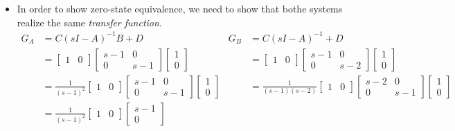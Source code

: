 \documentclass[10pt]{article}
\begin{document}
\begin{itemize}
\item[]
In order to show zero-state equivalence, we need to show that bothe
systems realize the same \emph{transfer function}.
\begin{align*}
  G_A &=C(sI-A)^{-1}B + D & G_B &= C(sI - A)^{-1} + D\\
  &=
  \begin{bmatrix}
    1 &0 
  \end{bmatrix}
  \begin{bmatrix}
    s-1 & 0 \\ 0 & s-1
  \end{bmatrix}
  \begin{bmatrix}
    1\\0
  \end{bmatrix}
  &&=
  \begin{bmatrix}
    1 &0 
  \end{bmatrix}
  \begin{bmatrix}
    s-1 & 0 \\ 0 & s-2
  \end{bmatrix}
  \begin{bmatrix}
    1\\0
  \end{bmatrix}\\
  &= \frac{1}{(s-1)^2}
  \begin{bmatrix}
    1 &0 
  \end{bmatrix}
  \begin{bmatrix}
    s-1 & 0 \\ 0 & s-1
  \end{bmatrix}
  \begin{bmatrix}
    1\\0
  \end{bmatrix}
  &&=\frac{1}{(s-1)(s-2)}
  \begin{bmatrix}
    1 &0 
  \end{bmatrix}
  \begin{bmatrix}
    s-2 & 0 \\ 0 & s-1
  \end{bmatrix}
  \begin{bmatrix}
    1\\0
  \end{bmatrix}\\
  &= \frac{1}{(s-1)^2}
  \begin{bmatrix}
    1 &0 
  \end{bmatrix}
  \begin{bmatrix}
    s-1  \\ 0 
  \end{bmatrix}

\end{align*}
\end{itemize}
\end{document}
